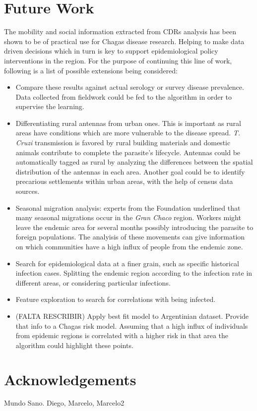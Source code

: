 \section{Future Work}

The mobility and social information extracted from CDRs analysis has been shown to be of practical use for Chagas disease research. Helping to make data driven decisions which in turn is key to support epidemiological policy interventions in the region. For the purpose of continuing this line of work, following is a list of possible extensions being considered:

\begin{itemize}
    \item Compare these results against actual serology or survey disease prevalence. Data collected from fieldwork could be fed to the algorithm in order to supervise the learning. 
    \item Differentiating rural antennas from urban ones. This is important as rural areas have conditions which are more vulnerable to the disease spread. \textit{T. Cruzi} transmission is favored by rural building materials and domestic animals contribute to complete the parasite's lifecycle. Antennas could be automatically tagged as rural by analyzing the differences between the spatial distribution of the antennas in each area. Another goal could be to identify precarious settlements within urban areas, with the help of census data sources.
    \item Seasonal migration analysis:  experts from the Foundation underlined that many seasonal migrations occur in the \textit{Gran Chaco} region.  Workers might leave the endemic area for several months possibly introducing the parasite to foreign populations. The analyisis of these movements can give information on which communities have a high influx of people from the endemic zone.
    \item Search for epidemiological data at a finer grain, such as specific historical infection cases. Splitting the endemic region according to the infection rate in different areas, or considering particular infections.
    \item Feature exploration to search for correlations with being infected.
    \item (FALTA RESCRIBIR) Apply best fit model to Argentinian dataset. Provide that info to a Chagas risk model. Assuming that a high influx of individuals from epidemic regions is correlated with a higher risk in that area the algorithm could highlight these points. %
\end{itemize}

\section{Acknowledgements}
Mundo Sano. Diego, Marcelo, Marcelo2